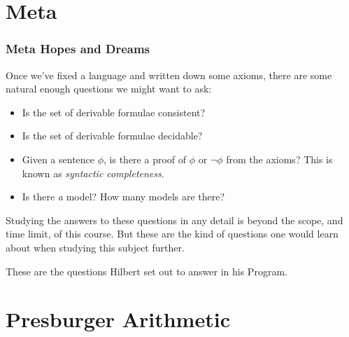 \documentclass{beamer}
\begin{document}
\section{Meta}

\begin{frame}
	\frametitle{Meta Hopes and Dreams}
	
	Once we've fixed a language and written down some axioms, there are some natural enough questions we might want to ask: 
	
	\begin{itemize}
		\item Is the set of derivable formulae consistent?
		\item Is the set of derivable formulae decidable? 
		\item Given a sentence $\phi$, is there a proof of $\phi$ or $\lnot \phi$ from the axioms? This is known as \textit{syntactic completeness}.
		\item Is there \textit{a} model? How many models are there? 
	\end{itemize}

	Studying the answers to these questions in any detail is beyond the scope, and time limit, of this course. But these are the kind of questions one would learn about when studying this subject further. 
	
	\vspace{0.2cm}
	
	These are the questions Hilbert set out to answer in his Program. 
	
\end{frame}

\section{Presburger Arithmetic}
\end{document}
